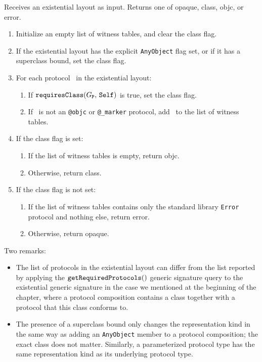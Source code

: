 \documentclass[../generics]{subfiles}
\begin{document}
\begin{algorithm}\label{alg:existential representation}
Receives an existential layout as input. Returns one of \textsf{opaque}, \textsf{class}, \textsf{objc}, or \textsf{error}.
\begin{enumerate}
\item Initialize an empty list of witness tables, and clear the class flag.
\item If the existential layout has the explicit \texttt{AnyObject} flag set, or if it has a superclass bound, set the class flag.
\item For each protocol \tP\ in the existential layout:
\begin{enumerate}
\item If $\texttt{requiresClass}(G_{\texttt{P}},\,\texttt{Self})$ is true, set the class flag.
\item If \tP\ is not an \texttt{@objc} or \verb|@_marker| protocol, add \tP\ to the list of witness tables.
\end{enumerate}
\item If the class flag is set:
\begin{enumerate}
\item If the list of witness tables is empty, return \textsf{objc}.
\item Otherwise, return \textsf{class}.
\end{enumerate}
\item If the class flag is not set:
\begin{enumerate}
\item If the list of witness tables contains only the standard library \texttt{Error} protocol and nothing else, return \textsf{error}.
\item Otherwise, return \textsf{opaque}.
\end{enumerate}
\end{enumerate}
\end{algorithm}

Two remarks:
\begin{itemize}
\item 
The list of protocols in the existential layout can differ from the list reported by applying the $\texttt{getRequiredProtocols}()$ generic signature query to the existential generic signature in the case we mentioned at the beginning of the chapter, where a protocol composition contains a class together with a protocol that this class conforms to.

\item The presence of a superclass bound only changes the representation kind in the same way as adding an \texttt{AnyObject} member to a protocol composition; the exact class does not matter. Similarly, a parameterized protocol type has the same representation kind as its underlying protocol type.
\end{itemize}
\end{document}
